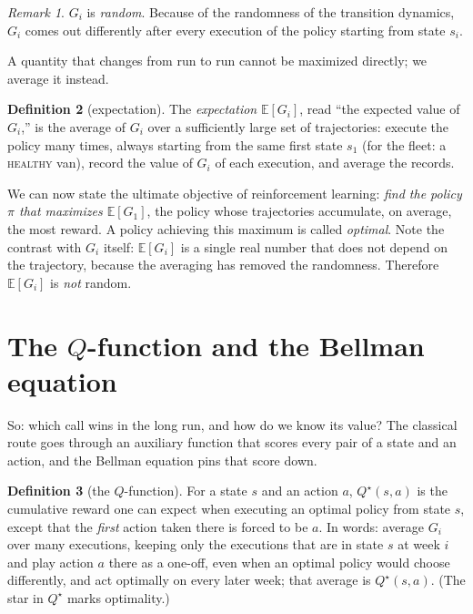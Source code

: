 \documentclass[11pt,a4paper]{article}
\theoremstyle{definition}
\newtheorem{definition}{Definition}[section]
\theoremstyle{remark}
\newtheorem{remark}[definition]{Remark}
\numberwithin{equation}{section}
\newcommand{\E}{\mathbb{E}}
\newcommand{\sa}[1]{\textsc{#1}}   %
\begin{document}
\begin{remark}
$G_i$ is \emph{random}. Because of the randomness of the transition dynamics, $G_i$ comes out
differently after every execution of the policy starting from state $s_i$.
\end{remark}

A quantity that changes from run to run cannot be maximized directly; we average it instead.

\begin{definition}[expectation]\label{def:expectation}
The \emph{expectation} $\E[G_i]$, read ``the expected value of $G_i$,'' is the average of
$G_i$ over a sufficiently large set of trajectories: execute the policy many times, always
starting from the same first state $s_1$ (for the fleet: a \sa{healthy} van), record the
value of $G_i$ of each execution, and average the records.
\end{definition}

We can now state the ultimate objective of reinforcement learning: \emph{find the policy
$\pi$ that maximizes $\E[G_1]$}, the policy whose trajectories accumulate, on average, the
most reward. A policy achieving this maximum is called \emph{optimal}. Note the contrast
with $G_i$ itself: $\E[G_i]$ is a single real number that does not depend on the
trajectory, because the averaging has removed the randomness. Therefore
$\E[G_i]$ is \emph{not} random.

\section{The \texorpdfstring{$Q$}{Q}-function and the Bellman equation}\label{sec:qfunction}

So: which call wins in the long run, and how do we know its value? The classical route goes
through an auxiliary function that scores every pair of a state and an action, and the
Bellman equation pins that score down.

\begin{definition}[the $Q$-function]
For a state $s$ and an action $a$, $Q^\star(s, a)$ is the cumulative reward one can expect
when executing an optimal policy from state $s$, except that the \emph{first} action taken
there is forced to be $a$. In words: average $G_i$ over many executions, keeping only the
executions that are in state $s$ at week $i$ and play action $a$ there as a one-off, even when
an optimal policy would choose differently, and act optimally on every later week; that
average is $Q^\star(s, a)$. (The star in $Q^\star$ marks optimality.)
\end{definition}
\end{document}

